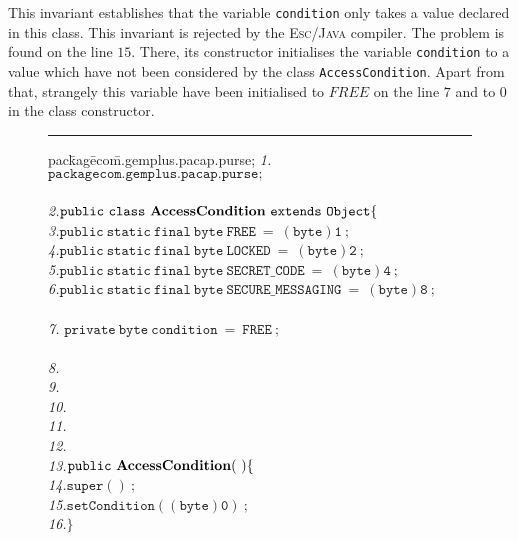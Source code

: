 This invariant establishes that the variable \texttt{condition} only
takes a value declared in this class. This invariant is rejected by
the \textsc{Esc/Java} compiler. The problem is found on the line
$15$. There, its constructor initialises the variable
\texttt{condition} to a value which have not been considered by the
class \texttt{AccessCondition}. Apart from that, strangely this
variable have been initialised to $FREE$ on the line $7$ and to $0$
in the class constructor.




\begin{center}
\begin{figure}[hbt]
\rule{\linewidth}{0.3mm}
\rule{0em}{0.1ex}
\begin{tabbing} 
pac\=kag\=eco\=m.gemplus.pacap.purse; \kill 
\emph{1.}\>$\mathtt{package com.gemplus.pacap.purse;}$\\
\\
\emph{2.}\>$\mathtt{public\ class\ {\bf AccessCondition}\ extends\ Object\{}$\\

\emph{3.}\>\>$\mathtt{public\ static\ final\ byte\ FREE\		=\ (byte)1\ ;}$\\
\emph{4.}\>\>$\mathtt{public\ static\ final\ byte\ LOCKED\		=\ (byte)2\ ;}$\\
\emph{5.}\>\>$\mathtt{public\ static\ final\ byte\ SECRET\_CODE\	=\ (byte)4\ ;}$\\
\emph{6.}\>\>$\mathtt{public\ static\ final\ byte\ SECURE\_MESSAGING\	=\
(byte)8\ ; }$\\
\\
\emph{7.}\> $\mathtt{private\ byte\ condition\ =\ FREE\ ;}$\\
\\
\emph{8.}\>\\
\emph{9.}\>\>\\
\emph{10.}\>\>\\
\emph{11.}\>\>\\
\emph{12.}\>\>{\it */} \\
\emph{13.}\>\>$\mathtt{public\ {\bf AccessCondition}(\ ) \{}$\\
\emph{14.}\>\>\>$\mathtt{super()\ ;}$\\
\emph{15.}\>\>\>$\mathtt{setCondition((byte)0)\ ;}$\\
\emph{16.}\>\>$\mathtt{\}}$\\


\end{tabbing}
\end{figure}
\end{center}
